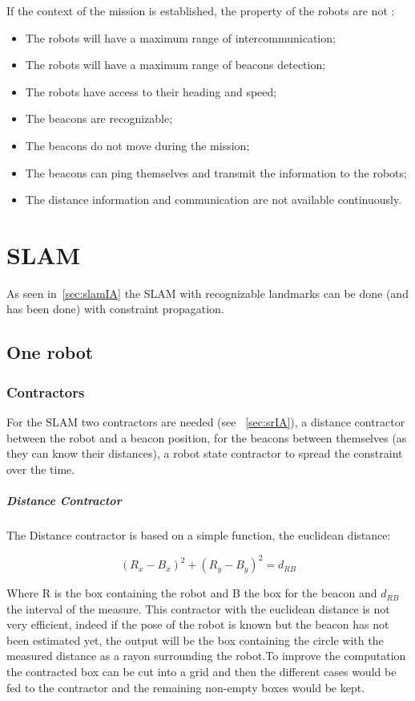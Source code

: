 If the context of the mission is established, the property of the robots are not :
  
\begin{itemize}[label=$-$,itemsep=0cm,topsep=0cm]
\item The robots will have a maximum range of intercommunication;
\item The robots will have a maximum range of beacons detection;
\item The robots have access to their heading and speed;
\item The beacons are recognizable;
\item The beacons do not move during the mission;
\item The beacons can ping themselves and transmit the information to the robots;
\item The distance information and communication are not available continuously.
\end{itemize}

\section{SLAM} \label{sec:slamtheory}

As seen in~\ref{sec:slamIA} the SLAM with recognizable landmarks can be done (and has been done) with constraint propagation.

\subsection{One robot}

\subsubsection*{Contractors}\label{sssec:contract}
For the SLAM two contractors are needed (see ~\ref{sec:srIA}), a distance contractor between the robot and a beacon position, for the beacons between themselves (as they can know their distances), a robot state contractor to spread the constraint over the time.

\subparagraph{Distance Contractor}
The Distance contractor is based on a simple function, the euclidean distance:

\begin{equation}
(R_{x}-B_{x})^{2}+(R_{y}-B_{y})^{2} = d_{RB} 
\end{equation}

Where R is the box containing the robot and B the box for the beacon and $d_{RB}$ the interval of the measure. This contractor with the euclidean distance is not very efficient, indeed if the pose of the robot is known but the beacon has not been estimated yet, the output will be the box containing the circle with the measured distance as a rayon surrounding the robot.To improve the computation the contracted box can be cut into a grid and then the different cases would be fed to the contractor and the remaining non-empty boxes would be kept.


